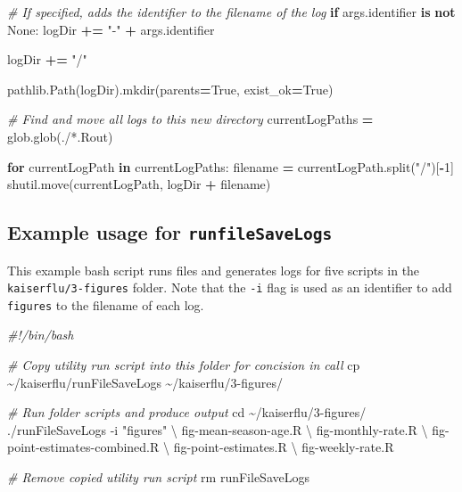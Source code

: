 \documentclass[
]{book}
\newenvironment{Shaded}{\begin{snugshade}}{\end{snugshade}}
\newcommand{\AttributeTok}[1]{\textcolor[rgb]{0.77,0.63,0.00}{#1}}
\newcommand{\BuiltInTok}[1]{#1}
\newcommand{\CommentTok}[1]{\textcolor[rgb]{0.56,0.35,0.01}{\textit{#1}}}
\newcommand{\ControlFlowTok}[1]{\textcolor[rgb]{0.13,0.29,0.53}{\textbf{#1}}}
\newcommand{\DataTypeTok}[1]{\textcolor[rgb]{0.13,0.29,0.53}{#1}}
\newcommand{\DecValTok}[1]{\textcolor[rgb]{0.00,0.00,0.81}{#1}}
\newcommand{\ExtensionTok}[1]{#1}
\newcommand{\FunctionTok}[1]{\textcolor[rgb]{0.00,0.00,0.00}{#1}}
\newcommand{\KeywordTok}[1]{\textcolor[rgb]{0.13,0.29,0.53}{\textbf{#1}}}
\newcommand{\NormalTok}[1]{#1}
\newcommand{\OperatorTok}[1]{\textcolor[rgb]{0.81,0.36,0.00}{\textbf{#1}}}
\newcommand{\StringTok}[1]{\textcolor[rgb]{0.31,0.60,0.02}{#1}}
\newcommand{\VariableTok}[1]{\textcolor[rgb]{0.00,0.00,0.00}{#1}}
\begin{document}
\begin{Shaded}
\begin{Highlighting}[]
\CommentTok{\# If specified, adds the identifier to the filename of the log}
\ControlFlowTok{if}\NormalTok{ args.identifier }\KeywordTok{is} \KeywordTok{not} \VariableTok{None}\NormalTok{:}
\NormalTok{  logDir }\OperatorTok{+=} \StringTok{"{-}"} \OperatorTok{+}\NormalTok{ args.identifier}

\NormalTok{logDir }\OperatorTok{+=} \StringTok{"/"}

\NormalTok{pathlib.Path(logDir).mkdir(parents}\OperatorTok{=}\VariableTok{True}\NormalTok{, exist\_ok}\OperatorTok{=}\VariableTok{True}\NormalTok{)}

\CommentTok{\# Find and move all logs to this new directory}
\NormalTok{currentLogPaths }\OperatorTok{=}\NormalTok{ glob.glob(}\StringTok{\textquotesingle{}./*.Rout\textquotesingle{}}\NormalTok{)}

\ControlFlowTok{for}\NormalTok{ currentLogPath }\KeywordTok{in}\NormalTok{ currentLogPaths:}
\NormalTok{  filename }\OperatorTok{=}\NormalTok{ currentLogPath.split(}\StringTok{"/"}\NormalTok{)[}\OperatorTok{{-}}\DecValTok{1}\NormalTok{]}
\NormalTok{  shutil.move(currentLogPath, logDir }\OperatorTok{+}\NormalTok{ filename)}
\end{Highlighting}
\end{Shaded}

\hypertarget{example-usage-for-runfilesavelogs}{%
\subsection{\texorpdfstring{Example usage for \texttt{runfileSaveLogs}}{Example usage for runfileSaveLogs}}\label{example-usage-for-runfilesavelogs}}

This example bash script runs files and generates logs for five scripts in the \texttt{kaiserflu/3-figures} folder. Note that the \texttt{-i} flag is used as an identifier to add \texttt{figures} to the filename of each log.

\begin{Shaded}
\begin{Highlighting}[]
\CommentTok{\#!/bin/bash}

\CommentTok{\# Copy utility run script into this folder for concision in call}
\FunctionTok{cp}\NormalTok{ \textasciitilde{}/kaiserflu/runFileSaveLogs \textasciitilde{}/kaiserflu/3{-}figures/}

\CommentTok{\# Run folder scripts and produce output}
\BuiltInTok{cd}\NormalTok{ \textasciitilde{}/kaiserflu/3{-}figures/}
\ExtensionTok{./runFileSaveLogs} \AttributeTok{{-}i} \StringTok{"figures"} \DataTypeTok{\textbackslash{}}
\NormalTok{fig{-}mean{-}season{-}age.R }\DataTypeTok{\textbackslash{}}
\NormalTok{fig{-}monthly{-}rate.R }\DataTypeTok{\textbackslash{}}
\NormalTok{fig{-}point{-}estimates{-}combined.R }\DataTypeTok{\textbackslash{}}
\NormalTok{fig{-}point{-}estimates.R }\DataTypeTok{\textbackslash{}}
\NormalTok{fig{-}weekly{-}rate.R}

\CommentTok{\# Remove copied utility run script}
\FunctionTok{rm}\NormalTok{ runFileSaveLogs}
\end{Highlighting}
\end{Shaded}
\end{document}
